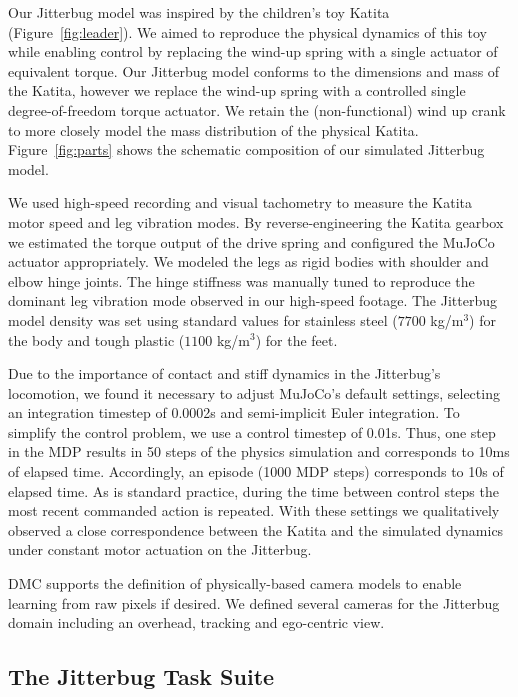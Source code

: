 \documentclass{article}
\begin{document}
Our Jitterbug model was inspired by the children's toy Katita (Figure~\ref{fig:leader}).
We aimed to reproduce the physical dynamics of this toy while enabling control by replacing the wind-up spring with a single actuator of equivalent torque.
Our Jitterbug model conforms to the dimensions and mass of the Katita, however we replace the wind-up spring with a controlled single degree-of-freedom torque actuator.
We retain the (non-functional) wind up crank to more closely model the mass distribution of the physical Katita.
Figure~\ref{fig:parts} shows the schematic composition of our simulated Jitterbug model.

We used high-speed recording and visual tachometry to measure the Katita motor speed and leg vibration modes.
By reverse-engineering the Katita gearbox we estimated the torque output of the drive spring and configured the MuJoCo actuator appropriately.
We modeled the legs as rigid bodies with shoulder and elbow hinge joints.
The hinge stiffness was manually tuned to reproduce the dominant leg vibration mode observed in our high-speed footage.
The Jitterbug model density was set using standard values for stainless steel ($7700$ kg/m$^3$) for the body and tough plastic ($1100$ kg/m$^3$) for the feet.

Due to the importance of contact and stiff dynamics in the Jitterbug's locomotion, we found it necessary to adjust MuJoCo's default settings, selecting an integration timestep of 0.0002s and semi-implicit Euler integration.
To simplify the control problem, we use a control timestep of 0.01s.
Thus, one step in the MDP results in 50 steps of the physics simulation and corresponds to 10ms of elapsed time.
Accordingly, an episode (1000 MDP steps) corresponds to 10s of elapsed time.
As is standard practice, during the time between control steps the most recent commanded action is repeated.
With these settings we qualitatively observed a close correspondence between the Katita and the simulated dynamics under constant motor actuation on the Jitterbug.

DMC supports the definition of physically-based camera models to enable learning from raw pixels if desired.
We defined several cameras for the Jitterbug domain including an overhead, tracking and ego-centric view.

\subsection{The Jitterbug Task Suite}\label{sec:jt}
\end{document}
